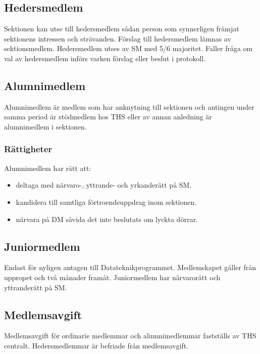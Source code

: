\documentclass{dgovdoc}
\begin{document}
\subsection{Hedersmedlem}
\label{sec:hedersmedlem}

Sektionen kan utse till hedersmedlem sådan person som synnerligen främjat
sektionens intressen och strävanden. Förslag till hedersmedlem lämnas av
sektionsmedlem. Hedersmedlem utses av SM med 5/6 majoritet. Faller fråga om val
av hedersmedlem införs varken förslag eller beslut i protokoll.

\subsection{Alumnimedlem}
\label{sec:alumnimedlem}

Alumnimedlem är medlem som har anknytning till sektionen och antingen under
samma period är stödmedlem hos THS eller av annan anledning är alumnimedlem i
sektionen.

\subsubsection{Rättigheter}

Alumnimedlem har rätt att:

\begin{itemize}
\item deltaga med närvaro-, yttrande- och yrkanderätt på SM.
\item kandidera till samtliga förtroendeuppdrag inom sektionen.
\item närvara på DM såvida det inte beslutats om lyckta dörrar.
\end{itemize}

\subsection{Juniormedlem}
\label{sec:juniormedlem}

Endast för nyligen antagen till Datateknikprogrammet. Medlemskapet gäller från
uppropet och två månader framåt. Juniormedlem har närvarorätt och yttranderätt
på SM.

\subsection{Medlemsavgift}

Medlemsavgift för ordinarie medlemmar och alumnimedlemmar fastställs av THS
centralt. Hedersmedlemmar är befriade från medlemsavgift.
\end{document}
